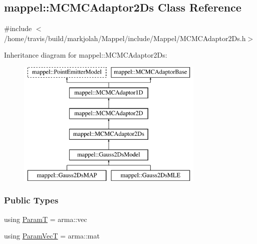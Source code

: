 \hypertarget{classmappel_1_1MCMCAdaptor2Ds}{}\subsection{mappel\+:\+:M\+C\+M\+C\+Adaptor2\+Ds Class Reference}
\label{classmappel_1_1MCMCAdaptor2Ds}


{\ttfamily \#include $<$/home/travis/build/markjolah/\+Mappel/include/\+Mappel/\+M\+C\+M\+C\+Adaptor2\+Ds.\+h$>$}

Inheritance diagram for mappel\+:\+:M\+C\+M\+C\+Adaptor2\+Ds\+:\begin{figure}[H]
\begin{center}
\leavevmode
\includegraphics[height=6.000000cm]{classmappel_1_1MCMCAdaptor2Ds}
\end{center}
\end{figure}
\subsubsection*{Public Types}
\begin{DoxyCompactItemize}
\item 
using \hyperlink{classmappel_1_1PointEmitterModel_a665ec6aea3aac139bb69a23c06d4b9a1}{ParamT} = arma\+::vec
\item 
using \hyperlink{classmappel_1_1PointEmitterModel_add253b568d763f1513a810aac35de719}{Param\+VecT} = arma\+::mat
\end{DoxyCompactItemize}
